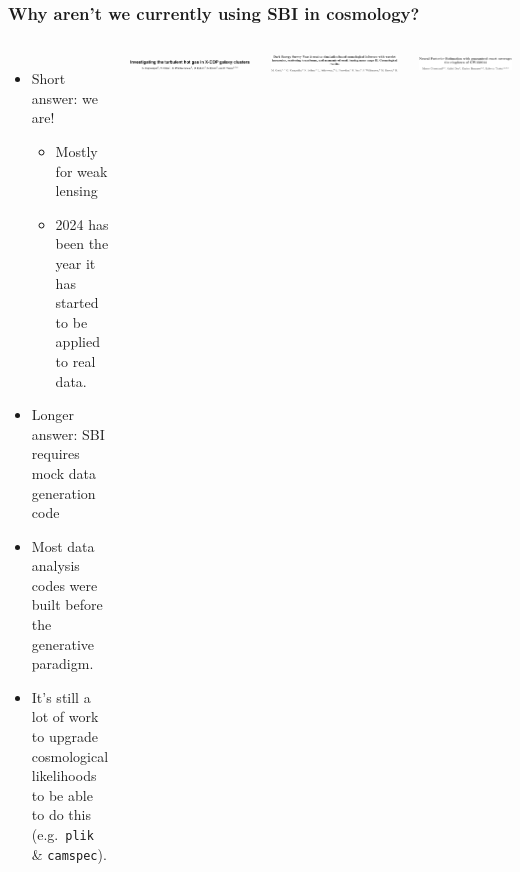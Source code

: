 \documentclass[aspectratio=169]{beamer}
\begin{document}
\begin{frame}
    \frametitle{Why aren't we currently using SBI in cosmology?}
    \begin{columns}
        \begin{itemize}
            \item Short answer: we are!
                \begin{itemize}
                    \item Mostly for weak lensing
                    \item 2024 has been the year it has started to be applied to real data.
                \end{itemize}
            \item Longer answer: SBI requires mock data generation code
            \item Most data analysis codes were built before the generative paradigm.
            \item It's still a lot of work to upgrade cosmological likelihoods  to be able to do this (e.g.\ \texttt{plik} \& \texttt{camspec}).
        \end{itemize}
        \includegraphics[width=\textwidth]{figures/sbi_papers/clusters.pdf}
        \vspace{10pt}

        \includegraphics[width=\textwidth]{figures/sbi_papers/des.pdf}
        \vspace{10pt}

        \includegraphics[width=\textwidth]{figures/sbi_papers/gw.pdf}
        \vspace{10pt}


\end{columns}
\end{frame}
\end{document}

